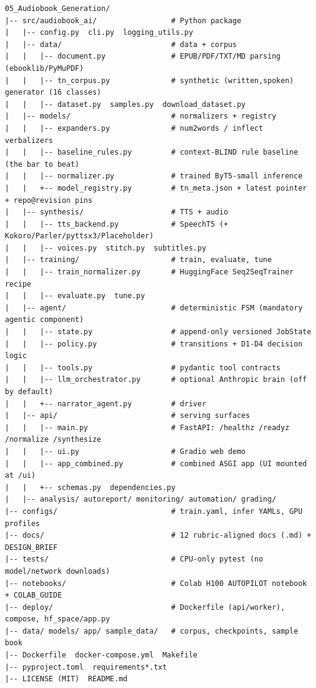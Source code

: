 \documentclass[12pt,a4paper]{article}
\begin{document}
\begin{lstlisting}[basicstyle=\ttfamily\footnotesize]
05_Audiobook_Generation/
|-- src/audiobook_ai/                 # Python package
|   |-- config.py  cli.py  logging_utils.py
|   |-- data/                         # data + corpus
|   |   |-- document.py               # EPUB/PDF/TXT/MD parsing (ebooklib/PyMuPDF)
|   |   |-- tn_corpus.py              # synthetic (written,spoken) generator (16 classes)
|   |   |-- dataset.py  samples.py  download_dataset.py
|   |-- models/                       # normalizers + registry
|   |   |-- expanders.py              # num2words / inflect verbalizers
|   |   |-- baseline_rules.py         # context-BLIND rule baseline (the bar to beat)
|   |   |-- normalizer.py             # trained ByT5-small inference
|   |   +-- model_registry.py         # tn_meta.json + latest pointer + repo@revision pins
|   |-- synthesis/                    # TTS + audio
|   |   |-- tts_backend.py            # SpeechT5 (+ Kokoro/Parler/pyttsx3/Placeholder)
|   |   |-- voices.py  stitch.py  subtitles.py
|   |-- training/                     # train, evaluate, tune
|   |   |-- train_normalizer.py       # HuggingFace Seq2SeqTrainer recipe
|   |   |-- evaluate.py  tune.py
|   |-- agent/                        # deterministic FSM (mandatory agentic component)
|   |   |-- state.py                  # append-only versioned JobState
|   |   |-- policy.py                 # transitions + D1-D4 decision logic
|   |   |-- tools.py                  # pydantic tool contracts
|   |   |-- llm_orchestrator.py       # optional Anthropic brain (off by default)
|   |   +-- narrator_agent.py         # driver
|   |-- api/                          # serving surfaces
|   |   |-- main.py                   # FastAPI: /healthz /readyz /normalize /synthesize
|   |   |-- ui.py                     # Gradio web demo
|   |   |-- app_combined.py           # combined ASGI app (UI mounted at /ui)
|   |   +-- schemas.py  dependencies.py
|   |-- analysis/ autoreport/ monitoring/ automation/ grading/
|-- configs/                          # train.yaml, infer YAMLs, GPU profiles
|-- docs/                             # 12 rubric-aligned docs (.md) + DESIGN_BRIEF
|-- tests/                            # CPU-only pytest (no model/network downloads)
|-- notebooks/                        # Colab H100 AUTOPILOT notebook + COLAB_GUIDE
|-- deploy/                           # Dockerfile (api/worker), compose, hf_space/app.py
|-- data/ models/ app/ sample_data/   # corpus, checkpoints, sample book
|-- Dockerfile  docker-compose.yml  Makefile
|-- pyproject.toml  requirements*.txt
|-- LICENSE (MIT)  README.md
\end{lstlisting}
\end{document}
